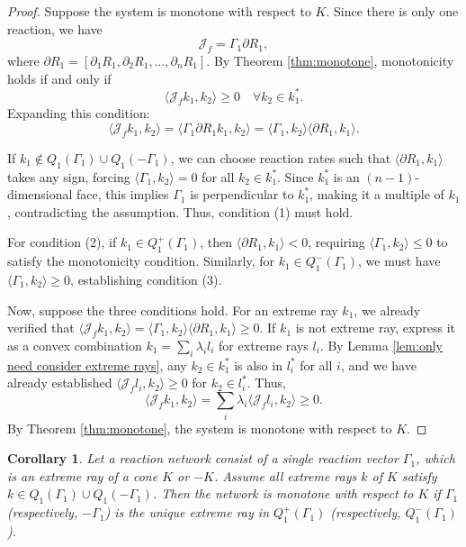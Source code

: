 \documentclass{article}
\newtheorem{cor}{Corollary}
\begin{document}
\begin{proof}
Suppose the system is monotone with respect to \( K \). Since there is only one reaction, we have
\[
\mathcal{J}_f = \Gamma_1 \partial R_1,
\]
where \( \partial R_1 = [\partial_1 R_1, \partial_2 R_1, \dots, \partial_n R_1] \). By Theorem \ref{thm:monotone}, monotonicity holds if and only if
\[
\langle \mathcal{J}_f k_1, k_2 \rangle \geq 0 \quad \forall k_2 \in k_1^*.
\]
Expanding this condition:
\[
\langle \mathcal{J}_f k_1, k_2 \rangle = \langle \Gamma_1 \partial R_1 k_1, k_2 \rangle = \langle \Gamma_1, k_2 \rangle \langle \partial R_1, k_1\rangle.
\]

If \( k_1 \notin Q_1(\Gamma_1) \cup Q_1(-\Gamma_1) \), we can choose reaction rates such that \( \langle \partial R_1, k_1 \rangle \) takes any sign, forcing \( \langle \Gamma_1, k_2 \rangle = 0 \) for all \( k_2 \in k_1^* \). Since \( k_1^* \) is an \( (n-1) \)-dimensional face, this implies \( \Gamma_1 \) is perpendicular to \( k_1^* \), making it a multiple of \( k_1 \), contradicting the assumption. Thus, condition (1) must hold.

For condition (2), if \( k_1 \in Q_1^+(\Gamma_1) \), then \( \langle \partial R_1, k_1 \rangle < 0 \), requiring \( \langle \Gamma_1, k_2 \rangle \leq 0 \) to satisfy the monotonicity condition. Similarly, for \( k_1 \in Q_1^-(\Gamma_1) \), we must have \( \langle \Gamma_1, k_2 \rangle \geq 0 \), establishing condition (3).

Now, suppose the three conditions hold. For an extreme ray \( k_1 \), we already verified that \( \langle \mathcal{J}_f k_1, k_2 \rangle = \langle \Gamma_1, k_2 \rangle \langle \partial R_1, k_1\rangle \geq 0 \). If \( k_1 \) is not extreme ray, express it as a convex combination \( k_1 = \sum_i \lambda_i l_i \) for extreme rays \( l_i \). By Lemma \ref{lem:only need consider extreme rays}, any \( k_2 \in k_1^* \) is also in \( l_i^* \) for all \( i \), and we have already established \( \langle \mathcal{J}_f l_i, k_2 \rangle \geq 0 \) for $k_2 \in l_i^*$. Thus, 
\[
\langle \mathcal{J}_f k_1, k_2 \rangle = \sum_i \lambda_i \langle \mathcal{J}_f l_i, k_2 \rangle \geq 0.
\]
By Theorem \ref{thm:monotone}, the system is monotone with respect to \( K \).
\end{proof}






\begin{cor}
\label{lem:reac_vec_extreme ray}
Let a reaction network consist of a single reaction vector \( \Gamma_1 \), which is an extreme ray of a cone \( K \) or \( -K \). Assume all extreme rays \( k \) of \( K \) satisfy \( k \in Q_1(\Gamma_1) \cup Q_1(-\Gamma_1) \). Then the network is monotone with respect to \( K \) if \( \Gamma_1 \) (respectively, \( -\Gamma_1 \)) is the unique extreme ray in \( Q_1^+(\Gamma_1) \) (respectively, \( Q_1^-(\Gamma_1) \)).
\end{cor}
\end{document}
